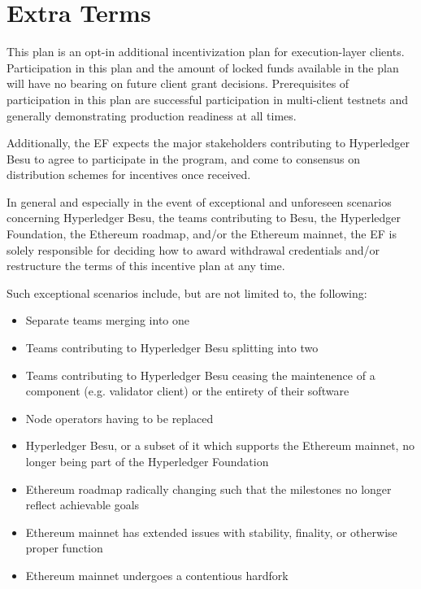 
\section{Extra Terms} \label{sec:terms}
This plan is an opt-in additional incentivization plan for execution-layer clients. Participation in this plan and the amount of locked funds available in the plan will have no bearing on future client grant decisions. Prerequisites of participation in this plan are successful participation in multi-client testnets and generally demonstrating production readiness at all times.

Additionally, the EF expects the major stakeholders contributing to Hyperledger Besu to agree to participate in the program, and come to consensus on distribution schemes for incentives once received.

In general and especially in the event of exceptional and unforeseen scenarios concerning Hyperledger Besu, the teams contributing to Besu, the Hyperledger Foundation, the Ethereum roadmap, and/or the Ethereum mainnet, the EF is solely responsible for deciding how to award withdrawal credentials and/or restructure the terms of this incentive plan at any time.

Such exceptional scenarios include, but are not limited to, the following:

\begin{itemize}
\item Separate teams merging into one
\item Teams contributing to Hyperledger Besu splitting into two
\item Teams contributing to Hyperledger Besu ceasing the maintenence of a component (e.g. validator client) or the entirety of their software
\item Node operators having to be replaced
\item Hyperledger Besu, or a subset of it which supports the Ethereum mainnet, no longer being part of the Hyperledger Foundation
\item Ethereum roadmap radically changing such that the milestones no longer reflect achievable goals
\item Ethereum mainnet has extended issues with stability, finality, or otherwise proper function
\item Ethereum mainnet undergoes a contentious hardfork
\end{itemize}
